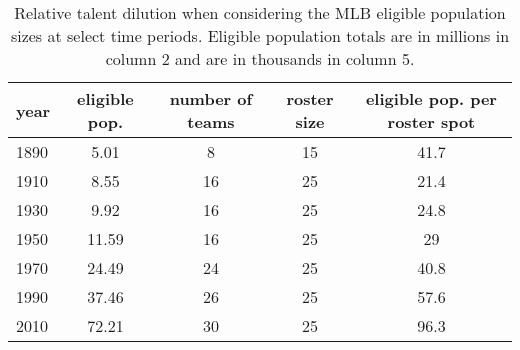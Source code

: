 \documentclass[11pt]{article}\usepackage[]{graphicx}\usepackage[]{color}
\begin{document}
\begin{table}[h!]
\begin{center}
\begin{tabular}{lcccc}
\hline
year & eligible pop. & number of teams & roster size & eligible pop. per roster spot \\
\hline
1890 & 5.01  & 8  & 15 & 41.7   \\
1910 & 8.55  & 16 & 25 & 21.4  \\
1930 & 9.92  & 16 & 25 & 24.8  \\
1950 & 11.59  & 16 & 25 & 29  \\
1970 & 24.49  & 24 & 25 & 40.8  \\
1990 & 37.46 & 26 & 25 & 57.6 \\
2010 & 72.21 & 30 & 25 & 96.3 \\
\hline
\end{tabular}
\end{center}
\caption{Relative talent dilution when considering the MLB eligible population 
  sizes at select time periods. Eligible population totals are in millions in 
  column 2 and are in thousands in column 5. }
\label{dilution}
\end{table}
\end{document}
